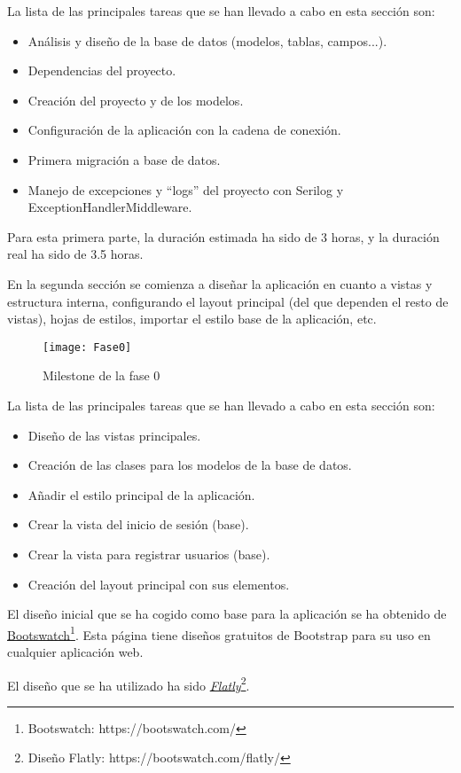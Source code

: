 La lista de las principales tareas que se han llevado a cabo en esta sección son:
\begin{itemize}
\tightlist
\item Análisis y diseño de la base de datos (modelos, tablas, campos...).
\item Dependencias del proyecto.
\item Creación del proyecto y de los modelos.
\item Configuración de la aplicación con la cadena de conexión.
\item Primera migración a base de datos.
\item Manejo de excepciones y ``logs'' del proyecto con Serilog y ExceptionHandlerMiddleware.
\end{itemize}

Para esta primera parte, la duración estimada ha sido de 3 horas, y la duración real ha sido de 3.5 horas.

En la segunda sección se comienza a diseñar la aplicación en cuanto a vistas y estructura interna,
configurando el layout principal (del que dependen el resto de vistas), hojas de estilos,
importar el estilo base de la aplicación, etc.
\begin{figure}
    \centering
    \texttt{[image: Fase0]}
    \caption{Milestone de la fase 0}
\end{figure}
\newpage
La lista de las principales tareas que se han llevado a cabo en esta sección son:
\begin{itemize}
\tightlist
\item Diseño de las vistas principales.
\item Creación de las clases para los modelos de la base de datos.
\item Añadir el estilo principal de la aplicación.
\item Crear la vista del inicio de sesión (base).
\item Crear la vista para registrar usuarios (base).
\item Creación del layout principal con sus elementos.
\end{itemize}

El diseño inicial que se ha cogido como base para la aplicación se ha obtenido de 
\href{https://bootswatch.com/}{Bootswatch}\footnote{Bootswatch: https://bootswatch.com/}. Esta página tiene diseños gratuitos de
Bootstrap para su uso en cualquier aplicación web.

El diseño que se ha utilizado ha sido \href{https://bootswatch.com/flatly/}{\emph{Flatly}}\footnote{Diseño Flatly: https://bootswatch.com/flatly/}.

